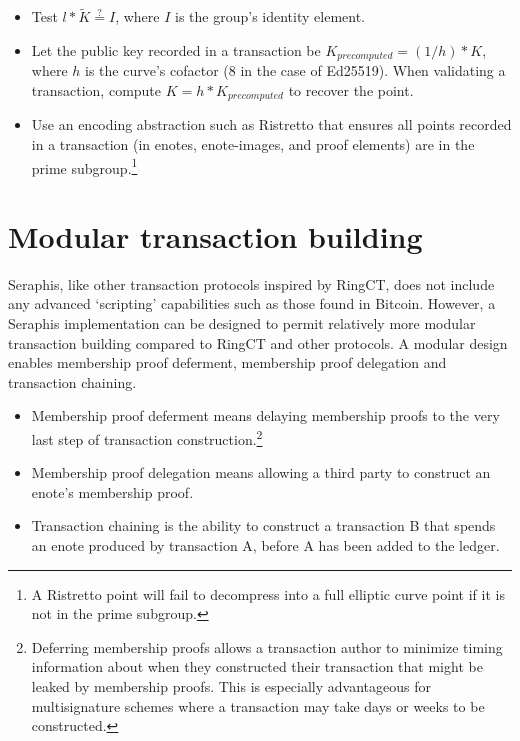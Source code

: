 \begin{itemize}
    \item Test $l*\tilde{K} \stackrel{?}{=} I$, where $I$ is the group's identity element.

    \item Let the public key recorded in a transaction be $K_{precomputed} = (1/h)*K$, where $h$ is the curve's cofactor (8 in the case of Ed25519). When validating a transaction, compute $K = h*K_{precomputed}$ to recover the point.

    \item Use an encoding abstraction such as Ristretto \cite{ristretto} that ensures all points recorded in a transaction (in enotes, enote-images, and proof elements) are in the prime subgroup.\footnote{A Ristretto point will fail to decompress into a full elliptic curve point if it is not in the prime subgroup.}
\end{itemize}



\section{Modular transaction building}
\label{sec:modular-tx-building}

Seraphis, like other transaction protocols inspired by RingCT, does not include any advanced `scripting' capabilities such as those found in Bitcoin. However, a Seraphis implementation can be designed to permit relatively more modular transaction building compared to RingCT and other protocols. A modular design enables membership proof deferment, membership proof delegation and transaction chaining.

\begin{itemize}
    \item Membership proof deferment means delaying membership proofs to the very last step of transaction construction.\footnote{Deferring membership proofs allows a transaction author to minimize timing information about when they constructed their transaction that might be leaked by membership proofs. This is especially advantageous for multisignature schemes where a transaction may take days or weeks to be constructed.}

    \item Membership proof delegation means allowing a third party to construct an enote's membership proof.

    \item Transaction chaining is the ability to construct a transaction B that spends an enote produced by transaction A, before A has been added to the ledger.
\end{itemize}

